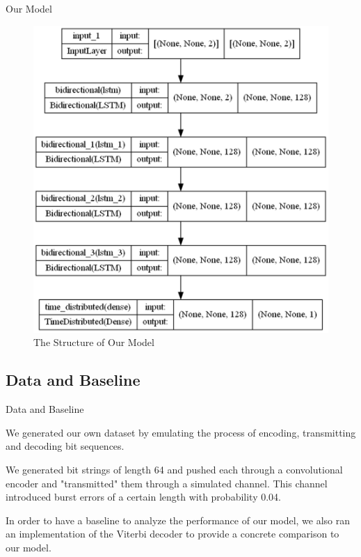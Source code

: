 \documentclass{beamer}
\newcommand{\<}				{\langle}
\renewcommand{\>}      		{\rangle}
\begin{document}
\begin{frame}{Our Model} 


\begin{figure}[h]
\includegraphics[scale=0.4]{our_model.png}
\caption{The Structure of Our Model}
\end{figure}

\end{frame}

\subsection{Data and Baseline} 

\begin{frame}{Data and Baseline} 

We generated our own dataset by emulating the process of encoding, transmitting and decoding bit sequences. 

\medskip

We generated bit strings of length 64 and pushed each through a convolutional encoder and "transmitted" them through a simulated channel. This channel introduced burst errors of a certain length with probability 0.04.

\medskip

In order to have a baseline to analyze the performance of our model, we also ran an implementation of the Viterbi decoder to provide a concrete comparison to our model.

\end{frame}
\end{document}
